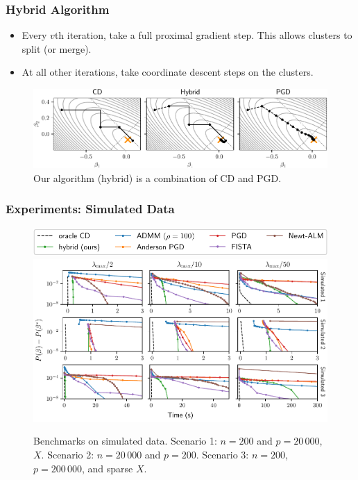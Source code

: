 \documentclass[10pt]{beamer}
\begin{document}
\begin{frame}[c]
  \frametitle{Hybrid Algorithm}

  \begin{itemize}
    \item Every \(v\)th iteration, take a full proximal gradient step. This allows clusters to split
          (or merge).
    \item At all other iterations, take coordinate descent steps on the clusters.
  \end{itemize}

  \pause

  \begin{figure}[htpb]
    \centering
    \includegraphics[width=\textwidth]{figures/paper5-illustration_solvers.pdf}
    \caption{%
      Our algorithm (hybrid) is a combination of CD and PGD.
    }
  \end{figure}
\end{frame}

\begin{frame}
  \frametitle{Experiments: Simulated Data}

  \begin{figure}[htpb]
    \centering
    \includegraphics[scale=0.5]{figures/paper5-simulated-legend.pdf}
    \includegraphics[scale=0.55]{figures/paper5-simulated.pdf}
    \caption{%
      Benchmarks on simulated data. Scenario 1: \(n = 200\) and \(p = 20\,000\),
      \(X\). Scenario 2: \(n = 20\,000\) and \(p = 200\). Scenario 3: \(n = 200\),
      \(p = 200\,000\), and sparse \(X\).
    }
  \end{figure}
\end{frame}
\end{document}
